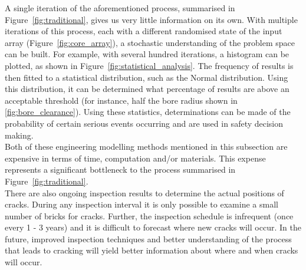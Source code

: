 \noindent
A single iteration of the aforementioned process, summarised in Figure~\ref{fig:traditional}, gives us very little information on its own. With multiple iterations of this process, each with a different randomised state of the input array (Figure~\ref{fig:core_array}), a stochastic  understanding of the problem space can be built. For example, with several hundred iterations, a histogram can be plotted, as shown in Figure~\ref{fig:statistical_analysis}. The frequency of results is then fitted to a statistical distribution, such as the Normal distribution. Using this distribution, it can be determined what percentage of results are above an acceptable threshold (for instance, half the bore radius shown in \ref{fig:bore_clearance}). Using these statistics, determinations can be made of the probability of certain serious events occurring and are used in safety decision making.\\

\noindent
Both of these engineering modelling methods mentioned in this subsection are expensive in terms of time, computation and/or materials. This expense represents a significant bottleneck to the process summarised in Figure~\ref{fig:traditional}.\\

\noindent
There are also ongoing inspection results to determine the actual positions of cracks. During any inspection interval it is only possible to examine a small number of bricks for cracks. Further, the inspection schedule is infrequent (once every 1 - 3 years) and it is difficult to forecast where new cracks will occur. In the future, improved inspection techniques and better understanding of the process that leads to cracking will yield better information about where and when cracks will occur.

